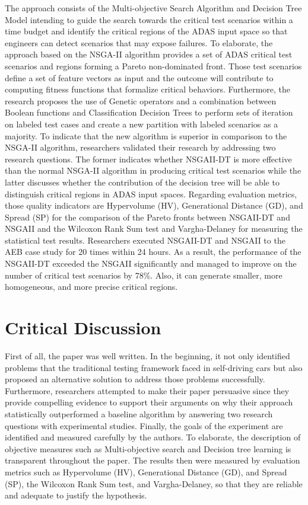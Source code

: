 \documentclass[10pt,a4paper]{report}
\begin{document}
The approach consists of the Multi-objective Search Algorithm and Decision Tree Model intending to guide the search towards the critical test scenarios within a time budget and identify the critical regions of the ADAS input space so that engineers can detect scenarios that may expose failures. 
%
To elaborate, the approach based on the NSGA-II algorithm provides a set of ADAS critical test scenarios and regions forming a Pareto non-dominated front.
%
Those test scenarios define a set of feature vectors as input and the outcome will contribute to computing fitness functions that formalize critical behaviors.
%
Furthermore, the research proposes the use of Genetic operators and
%
a combination between Boolean functions and Classification Decision Trees to perform sets of iteration on labeled test cases and create a new partition with labeled scenarios as a majority.
% 
To indicate that the new algorithm is superior in comparison to the NSGA-II algorithm, researchers validated their research by addressing two research questions.
%
The former indicates whether NSGAII-DT is more effective than the normal NSGA-II algorithm in producing critical test scenarios while the latter discusses whether the contribution of the decision tree will be able to distinguish critical regions in ADAS input spaces.
%
Regarding evaluation metrics, those quality indicators are Hypervolume (HV), Generational Distance (GD), and Spread (SP) for the comparison of the Pareto fronts between NSGAII-DT and NSGAII and 
% 
the Wilcoxon Rank Sum test and Vargha-Delaney for measuring the statistical test results.
%
Researchers executed NSGAII-DT and NSGAII to the AEB case study for 20 times within 24 hours.
%
As a result, the performance of the NSGAII-DT exceeded the NSGAII significantly and managed to improve on the number of critical test scenarios by 78\%.
% 
Also, it can generate smaller, more homogeneous, and more precise critical regions.



\section{Critical Discussion}
First of all, the paper was well written. In the beginning, it not only identified problems that the traditional testing framework faced in self-driving cars but also proposed an alternative solution to address those problems successfully.
%
Furthermore, researchers attempted to make their paper persuasive since they provide compelling evidence to support their arguments on why their approach statistically outperformed a baseline algorithm by answering two research questions with experimental studies.  
%
Finally, the goals of the experiment are identified and measured carefully by the authors.
%
To elaborate, the description of objective measures such as Multi-objective search and Decision tree learning is transparent throughout the paper. 
%
The results then were measured by evaluation metrics such as Hypervolume (HV), Generational Distance (GD), and Spread (SP), the Wilcoxon Rank Sum test, and Vargha-Delaney, so that they are reliable and adequate to justify the hypothesis.
%
\end{document}
